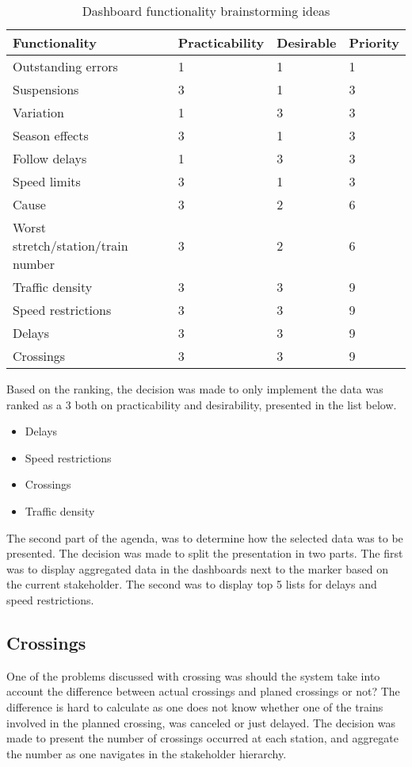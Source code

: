 \begin{table}[!h]\small
	\begin{tabularx}{\textwidth}{|X|l|l|l|}
		\hline
		Functionality & Practicability & Desirable & Priority\\
		\hline
		Outstanding errors & 1 & 1 & 1\\
		\hline
		Suspensions & 3 & 1 & 3\\
		\hline
		Variation & 1 & 3 & 3\\
		\hline
		Season effects & 3 & 1 & 3\\
		\hline
		Follow delays & 1 & 3 & 3\\
		\hline
		Speed limits & 3 & 1 & 3\\
		\hline
		Cause & 3 & 2 & 6\\
		\hline
	 	Worst stretch/station/train number & 3 & 2 & 6\\
		\hline
		Traffic density & 3 & 3 & 9\\
		\hline
		Speed restrictions & 3 & 3 & 9\\
		\hline
		Delays & 3 & 3 & 9\\
		\hline
		Crossings & 3 & 3 & 9\\
		\hline
	\end{tabularx}
\caption{Dashboard functionality brainstorming ideas}
\label{table:dashboard_functionality_wants_vs_needs}
\end{table}

Based on the ranking, the decision was made to only implement the data was
ranked as a 3 both on practicability and desirability, presented in the list
below.

\begin{itemize}
  \item Delays
  \item Speed restrictions
  \item Crossings
  \item Traffic density
\end{itemize}

The second part of the agenda, was to determine how the selected data was to be
presented. The decision was made to split the presentation in two parts. The
first was to display aggregated data in the dashboards next to the marker based
on the current stakeholder. The second was to display top 5 lists for delays
and speed restrictions.

\subsection{Crossings} %
\label{sub:crossings}
One of the problems discussed with crossing was should the system take into 
account the difference between actual crossings and planed crossings or not? 
The difference is hard to calculate as one does not know whether one of the 
trains involved in the planned crossing, was canceled or just delayed. The 
decision was made to present the number of crossings occurred at each station, 
and aggregate the number as one navigates in the stakeholder hierarchy.

